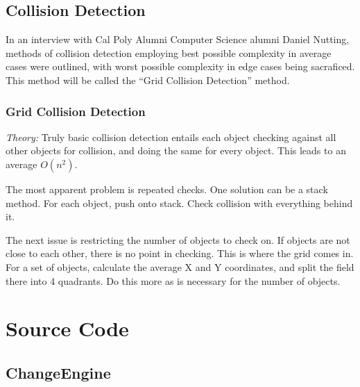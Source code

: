 \documentclass[12pt]{article}
\begin{document}
  \subsection{Collision Detection}
    In an interview with Cal Poly Alumni Computer Science alumni Daniel Nutting, methods of collision detection employing best possible complexity in average cases were outlined, with worst possible complexity in edge cases being sacraficed. This method will be called the ``Grid Collision Detection'' method.

    \subsubsection{Grid Collision Detection}
      \emph{Theory: } Truly basic collision detection entails each object checking against all other objects for collision, and doing the same for every object. This leads to an average $O(n^2)$.

      The most apparent problem is repeated checks. One solution can be a stack method. For each object, push onto stack. Check collision with everything behind it.

      The next issue is restricting the number of objects to check on. If objects are not close to each other, there is no point in checking. This is where the grid comes in. For a set of objects, calculate the average X and Y coordinates, and split the field there into 4 quadrants. Do this more as is necessary for the number of objects.

  \section{Source Code}
\subsection{ChangeEngine}
\end{document}
